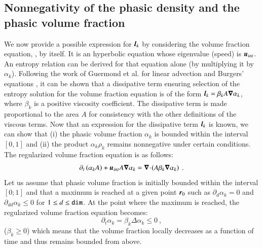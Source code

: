 \subsection{Nonnegativity of the phasic density and the phasic volume fraction}\label{sct:positivity}
%
We now provide a possible expression for $\boldsymbol l_k$ by considering the volume fraction equation, , by itself. 
It is an hyperbolic equation
whose eigenvalue (speed) is $\boldsymbol u_{int}$. An entropy relation can be derived for that equation alone (by multiplying it by $\alpha_k$).
Following the work of Guermond et al. for linear advection and Burgers' equations \cite{jlg_EVM_JCP2011,jlg_EVM_CSE2011}, it can be shown that a dissipative term ensuring 
selection of the entropy solution for the volume fraction equation is of the form $\boldsymbol l_k = \beta_k A \boldsymbol\nabla \alpha_k $, where $\beta_k$
is a positive viscosity coefficient. The dissipative term is made proportional to the area $A$ for consistency with 
the other definitions of the viscous terms. Now that an expression for the dissipative term $\boldsymbol l_k$ is known, we can show that (i) the phasic
volume fraction $\alpha_k$ is bounded within the interval $[0,1]$ and (ii) the product $\alpha_k \rho_k$ remains nonnegative under certain conditions.
The regularized volume fraction equation is as follows:
%
\begin{equation}\label{eq:final-reg-vf-equ}
\partial_t \left( \alpha_k A \right) + \boldsymbol u_{int} A \boldsymbol\nabla \alpha_k= \boldsymbol\nabla\! \cdot \! \left( A \beta_k \boldsymbol\nabla \alpha_k \right) \ .
\end{equation}
%
Let us assume that phasic volume fraction is initially bounded within the interval $[0;1]$ and that a maximum is reached at a given point $\boldsymbol r_0$
such as $ \partial_d \alpha_k = 0$ and $\partial_{dd} \alpha_k \leq 0$ for $1\le d \le {\tt dim}$.  
At the point where the maximum is reached, the regularized volume fraction equation becomes:
%
\begin{equation}\label{eq:final-reg-vf-equ-max}
\partial_t \alpha_k = \beta_k \Delta \alpha_k \leq 0 \ ,
\end{equation}
%
($\beta_k \ge 0$) which means that the volume fraction locally decreases as a function of time and thus remains bounded from above. 
